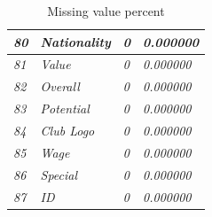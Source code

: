 \documentclass{article}
\begin{document}
\begin{table}[]
\begin{tabular}{|l|l|l|l|}
\textit{80}    & \textit{Nationality}          & \textit{0}             & \textit{0.000000}        \\ \hline
\textit{81}    & \textit{Value}                & \textit{0}             & \textit{0.000000}        \\ \hline
\textit{82}    & \textit{Overall}              & \textit{0}             & \textit{0.000000}        \\ \hline
\textit{83}    & \textit{Potential}            & \textit{0}             & \textit{0.000000}        \\ \hline
\textit{84}    & \textit{Club Logo}            & \textit{0}             & \textit{0.000000}        \\ \hline
\textit{85}    & \textit{Wage}                 & \textit{0}             & \textit{0.000000}        \\ \hline
\textit{86}    & \textit{Special}              & \textit{0}             & \textit{0.000000}        \\ \hline
\textit{87}    & \textit{ID}                   & \textit{0}             & \textit{0.000000}        \\ \hline
\end{tabular}
\caption{Missing value percent}
\end{table}
\newpage
\end{document}
